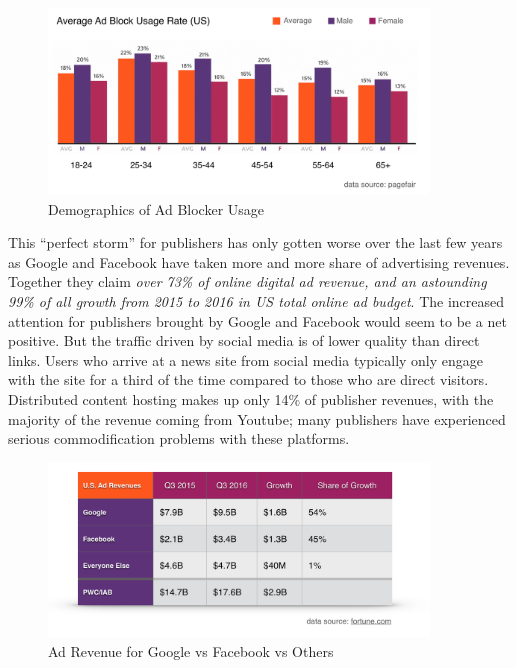\documentclass[11pt]{article}
\begin{document}
\begin{figure}
\begin{center}
\includegraphics[width=0.9\textwidth]{adblock_usage_demographics.png}
\caption{Demographics of Ad Blocker Usage}
\end{center}
\end{figure}



This ``perfect storm'' for publishers has only gotten worse over the last few years as Google and Facebook have taken more and more share of advertising revenues. Together they claim \textit{over 73\% of online digital ad revenue, and an astounding 99\% of all growth from 2015 to 2016 in US total online ad budget}\cite{12}.
The increased attention for publishers brought by Google and Facebook would seem to be a net positive. But the traffic driven by social media is of lower quality than direct links. Users who arrive at a news site from social media typically only engage with the site for a third\cite{SocMed} of the time compared to those who are direct visitors. Distributed content hosting makes up only 14\% of publisher revenues, with the majority of the revenue coming from Youtube\cite{DCN}; many publishers have experienced serious commodification problems with these platforms.


\begin{figure}
\begin{center}
\includegraphics[width=0.9\textwidth]{google_FB_everyone.png}
\caption{Ad Revenue for Google vs Facebook vs Others}
\end{center}
\end{figure}
\end{document}
